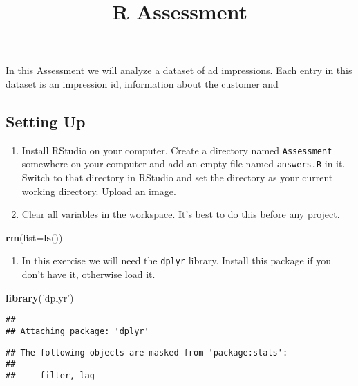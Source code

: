 \documentclass[
]{article}
\title{R Assessment}
\author{}
\date{\vspace{-2.5em}}
\newenvironment{Shaded}{\begin{snugshade}}{\end{snugshade}}
\newcommand{\DataTypeTok}[1]{\textcolor[rgb]{0.13,0.29,0.53}{#1}}
\newcommand{\KeywordTok}[1]{\textcolor[rgb]{0.13,0.29,0.53}{\textbf{#1}}}
\newcommand{\NormalTok}[1]{#1}
\newcommand{\StringTok}[1]{\textcolor[rgb]{0.31,0.60,0.02}{#1}}
\providecommand{\tightlist}{%
  \setlength{\itemsep}{0pt}\setlength{\parskip}{0pt}}
\begin{document}
\maketitle

In this Assessment we will analyze a dataset of ad impressions. Each
entry in this dataset is an impression id, information about the
customer and

\hypertarget{setting-up}{%
\subsection{Setting Up}\label{setting-up}}

\begin{enumerate}
\def\labelenumi{\arabic{enumi}.}
\item
  Install RStudio on your computer. Create a directory named
  \texttt{Assessment} somewhere on your computer and add an empty file
  named \texttt{answers.R} in it. Switch to that directory in RStudio
  and set the directory as your current working directory. Upload an
  image.
\item
  Clear all variables in the workspace. It's best to do this before any
  project.
\end{enumerate}

\begin{Shaded}
\begin{Highlighting}[]
\KeywordTok{rm}\NormalTok{(}\DataTypeTok{list=}\KeywordTok{ls}\NormalTok{())}
\end{Highlighting}
\end{Shaded}

\begin{enumerate}
\def\labelenumi{\arabic{enumi}.}
\setcounter{enumi}{2}
\tightlist
\item
  In this exercise we will need the \texttt{dplyr} library. Install this
  package if you don't have it, otherwise load it.
\end{enumerate}

\begin{Shaded}
\begin{Highlighting}[]
\KeywordTok{library}\NormalTok{(}\StringTok{'dplyr'}\NormalTok{)}
\end{Highlighting}
\end{Shaded}

\begin{verbatim}
## 
## Attaching package: 'dplyr'
\end{verbatim}

\begin{verbatim}
## The following objects are masked from 'package:stats':
## 
##     filter, lag
\end{verbatim}
\end{document}
